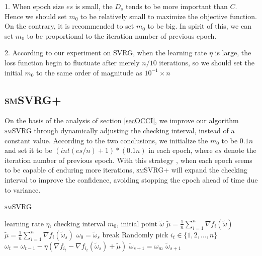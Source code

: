\documentclass[conference]{IEEEtran}
\begin{document}
1. When epoch size $es$ is small, the $D_s$ tends to be more important than $C$. Hence we should set $m_0$ to be relatively small to maximize the objective function. On the contrary, it is recommended to set $m_0$ to be big. In spirit of this, we can set $m_0$ to be proportional to the iteration number of previous epoch.

2. According to our experiment on SVRG, when the learning rate $\eta$ is large, the loss function begin to fluctuate after merely $n/10$ iterations, so we should set the initial $m_0$ to the same order of magnitude as $10^{-1} \times n$
 
 \subsection{\textsc{smSVRG+}}
 On the basis of the analysis of section \ref{secOCCI}, we improve our algorithm \textsc{smSVRG} through dynamically adjusting the checking interval, instead of a constant value. According to the two conclusions, we initialize the $m_0$ to be $0.1n$ and set it to be $(int(es/n)+1) * (0.1n)$ in each epoch, where $es$ denote the iteration number of previous epoch. With this strategy , when each epoch seems to be capable of enduring more iterations, \textsc{smSVRG+} will expand the checking interval to improve the confidence, avoiding stopping the epoch ahead of time due to variance.
 
 
 \begin{algorithm}
 	\caption{\textsc{smSVRG}}
	\label{smSVRG}
	\begin{algorithmic}[1]
	\Require learning rate $\eta$, checking interval $m_0$, initial point $\tilde{\omega}$
	\State $\tilde{\mu} = \frac{1}{n}\sum\limits_{i=1}^{n}\nabla f_{i}(\tilde{\omega})$
		\State $\tilde{\mu} = \frac{1}{n}\sum\limits_{i=1}^{n}\nabla f_{i}(\tilde{\omega}_{s})$
		\State $\omega_0 = \tilde{\omega}_s$
			\State break
			\EndIf
			\State Randomly pick $i_t\in\{1, 2, ..., n\}$
			\State $\omega_t = \omega_{t-1} - \eta(\nabla f_{i_t} - \nabla f_{i_t}(\tilde{\omega}_s)+\tilde{\mu})$
		\EndFor		
		\State $\tilde{\omega}_{s+1} = \omega_{m}$
	\EndFor
	\State \Return $\tilde{\omega}_{s+1}$
	\end{algorithmic}
\end{algorithm}
\end{document}
